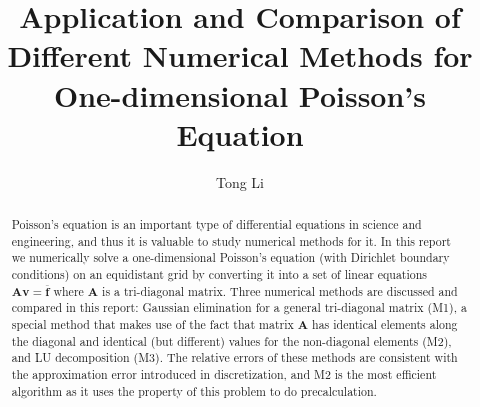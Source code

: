 \documentclass{article}
\title{Application and Comparison of Different Numerical Methods for One-dimensional Poisson's Equation}
\author[1]{Tong Li}
\affil[1]{Department of Physics and Astronomy, Michigan State University}
\date{}
\begin{document}
	\maketitle
	\begin{abstract}
	Poisson's equation is an important type of differential equations in science and engineering, 
	and thus it is valuable to study numerical methods for it.  
	In this report we numerically solve a one-dimensional Poisson's equation (with Dirichlet boundary conditions)
	on an equidistant grid 
	by converting it into a set of linear equations $\mathbf{A}\mathbf{v}=\mathbf{\overline{f}}$ 
	where $\mathbf{A}$ is a tri-diagonal matrix. 
	Three numerical methods are discussed and compared in this report: 
	Gaussian elimination for a general tri-diagonal matrix (M1), 
	a special method that makes use of the fact that matrix $\mathbf{A}$ has identical elements along the diagonal and identical (but different) values for the non-diagonal elements (M2), 
	and LU decomposition (M3). 
	The relative errors of these methods are consistent with the approximation error introduced in discretization, 
	and M2 is the most efficient algorithm as it uses the property of this problem to do precalculation. 
	\end{abstract}
\end{document}
